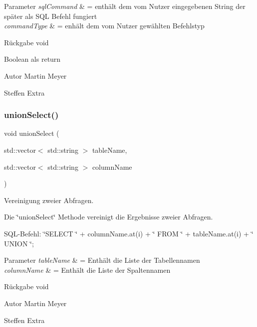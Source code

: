 \begin{DoxyParams}{Parameter}
{\em sql\+Command} & = enthält dem vom Nutzer eingegebenen String der später als S\+QL Befehl fungiert \\
\hline
{\em command\+Type} & = enhält dem vom Nutzer gewählten Befehlstyp\\
\hline
\end{DoxyParams}
\begin{DoxyReturn}{Rückgabe}
void
\end{DoxyReturn}
Boolean als return \begin{DoxyAuthor}{Autor}
Martin Meyer 

Steffen Extra 
\end{DoxyAuthor}
\mbox{\label{selection_request_8cpp_a1bde570da9c90a3d0f6e94bc1b06c5e3}} 
\subsubsection{union\+Select()}
{\footnotesize\ttfamily void union\+Select (\begin{DoxyParamCaption}\item[{std\+::vector$<$ std\+::string $>$}]{table\+Name,  }\item[{std\+::vector$<$ std\+::string $>$}]{column\+Name }\end{DoxyParamCaption})}



Vereinigung zweier Abfragen. 

Die \char`\"{}union\+Select\char`\"{} Methode vereinigt die Ergebnisse zweier Abfragen.~\newline


S\+Q\+L-\/\+Befehl\+: \char`\"{}\+S\+E\+L\+E\+C\+T \char`\"{} + column\+Name.\+at(i) + \char`\"{} F\+R\+O\+M \char`\"{} + table\+Name.\+at(i) + \char`\"{} U\+N\+I\+O\+N \char`\"{};


\begin{DoxyParams}{Parameter}
{\em table\+Name} & = Enthält die Liste der Tabellennamen \\
\hline
{\em column\+Name} & = Enthält die Liste der Spaltennamen\\
\hline
\end{DoxyParams}
\begin{DoxyReturn}{Rückgabe}
void
\end{DoxyReturn}
\begin{DoxyAuthor}{Autor}
Martin Meyer 

Steffen Extra 
\end{DoxyAuthor}
